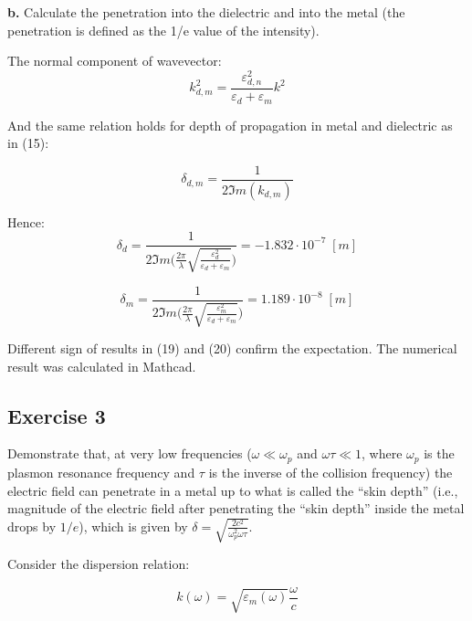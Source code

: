 \documentclass[11pt,a4paper]{article}
\begin{document}
\begin{displayquote}
\textbf{b. } Calculate the penetration into the dielectric and into the metal (the penetration is defined as the 1/e value of the intensity).
\end{displayquote}

The normal component of wavevector:
\begin{equation}
    k_{d,m}^2=\frac{\varepsilon_{d,n}^2}{\varepsilon_d+\varepsilon_m} k^2
\end{equation}

And the same relation holds for depth of propagation in metal and dielectric as in (15):

\begin{equation}
     \delta_{d,m}=\frac{1}{2 \Im m (k_{d,m})}
\end{equation}

Hence:
\begin{equation}
    \delta_{d}=\frac{1}{2 \Im m \big(\frac{2 \pi}{\lambda}\sqrt{\frac{\varepsilon_d^2}{\varepsilon_d + \varepsilon_m}}\big)}= -1.832 \cdot 10^{-7} \; [m]
\end{equation}

\begin{equation}
    \delta_{m}=\frac{1}{2 \Im m \big(\frac{2 \pi}{\lambda}\sqrt{\frac{\varepsilon_m^2}{\varepsilon_d + \varepsilon_m}}\big)}= 1.189 \cdot 10^{-8} \; [m]
\end{equation}

Different sign of results in (19) and (20) confirm the expectation. The numerical result was calculated in Mathcad. 

\subsection{Exercise 3}

Demonstrate that, at very low frequencies ($\omega \ll \omega_p$  and $\omega \tau \ll 1$, where $\omega_p$ is the plasmon resonance frequency and $ \tau $ is the inverse of the collision frequency) the electric field can penetrate in a metal up to what is called the “skin depth” (i.e., magnitude of the electric field after penetrating the “skin depth” inside
the metal drops by $1/e$), which is given by $\delta = \sqrt{\frac{2 c^2}{\omega_p^2 \omega \tau}}$.

Consider the dispersion relation:

\begin{equation}
    k (\omega)= \sqrt{\varepsilon_m(\omega)} \frac{\omega}{c}
\end{equation}
\end{document}
